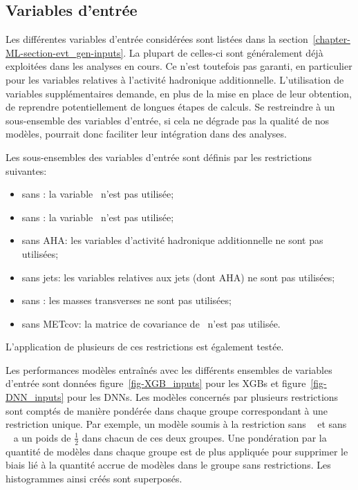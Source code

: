 \subsection{Variables d'entrée}\label{chapter-ML-section-hyperparameters-inputs}
Les différentes variables d'entrée considérées sont listées dans la section~\ref{chapter-ML-section-evt_gen-inputs}.
La plupart de celles-ci sont généralement déjà exploitées dans les analyses en cours.
Ce n'est toutefois pas garanti, en particulier pour les variables relatives à l'activité hadronique additionnelle.
L'utilisation de variables supplémentaires demande,
en plus de la mise en place de leur obtention,
de reprendre potentiellement de longues étapes de calculs.
Se restreindre à un sous-ensemble des variables d'entrée,
si cela ne dégrade pas la qualité de nos modèles,
pourrait donc faciliter leur intégration dans des analyses.
\par
Les sous-ensembles des variables d'entrée sont définis par les restrictions suivantes:
\begin{itemize}
\item sans \Npu: la variable \Npu\ n'est pas utilisée;
\item sans \Nnu: la variable \Nnu\ n'est pas utilisée;
\item sans AHA: les variables d'activité hadronique additionnelle ne sont pas utilisées;
\item sans jets: les variables relatives aux jets (dont AHA) ne sont pas utilisées;
\item sans \mT: les masses transverses ne sont pas utilisées;
\item sans METcov: la matrice de covariance de \MET\ n'est pas utilisée.
\end{itemize}
L'application de plusieurs de ces restrictions est également testée.
\par
Les performances modèles entraînés avec les différents ensembles de variables d'entrée sont données
figure~\ref{fig-XGB_inputs} pour les XGBs
et
figure~\ref{fig-DNN_inputs}
pour les DNNs.
Les modèles concernés par plusieurs restrictions sont comptés de manière pondérée dans chaque groupe correspondant à une restriction unique.
Par exemple, un modèle soumis à la restriction \og sans \Npu\ \fg{} et \og sans \Nnu\ \fg{} a un poids de $\frac{1}{2}$ dans chacun de ces deux groupes.
Une pondération par la quantité de modèles dans chaque groupe est de plus appliquée pour supprimer le biais lié à la quantité accrue de modèles dans le groupe sans restrictions.
Les histogrammes ainsi créés sont superposés.
